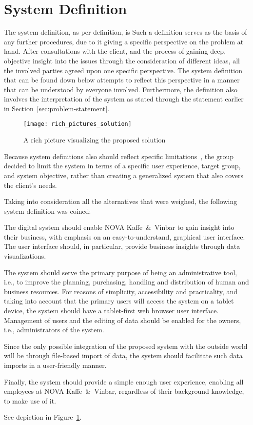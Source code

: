 \section{System Definition}\label{sec:system-definition}

The system definition, as per definition, is
Such a definition serves as the basis of any further procedures, due to it giving a specific perspective on the problem
at hand.
After consultations with the client, and the process of gaining deep, objective insight into the issues through the
consideration of different ideas, all the involved parties agreed upon one specific perspective.
The system definition that can be found down below attempts to reflect this perspective in a manner that can be
understood by everyone involved.
Furthermore, the definition also involves the interpretation of the system as stated through the statement earlier in
Section~\ref{sec:problem-statement}.

\begin{figure}[H]
    \centering
    \texttt{[image: rich\_pictures\_solution]}
    \caption{A rich picture visualizing the proposed solution}\label{fig:pda-solution}
\end{figure}

Because system definitions also should reflect specific limitations~\cite[38]{mathiassen2018}, the group decided to
limit the system in terms of a specific user experience, target group, and system objective, rather than creating a
generalized system that also covers the client's needs.

Taking into consideration all the alternatives that were weighed, the following system definition was coined:
\begin{tcolorbox}[title=System definition]
    The digital system should enable NOVA Kaffe~\&~Vinbar to gain insight into their business, with emphasis on an
    easy-to-understand, graphical user interface.
    The user interface should, in particular, provide business insights through data visualizations.

    The system should serve the primary purpose of being an administrative tool, i.e., to improve the planning,
    purchasing, handling and distribution of human and business resources.
    For reasons of simplicity, accessibility and practicality, and taking into account that the primary users will
    access the system on a tablet device, the system should have a tablet-first web browser user interface.
    Management of users and the editing of data should be enabled for the owners, i.e., administrators of the system.

    Since the only possible integration of the proposed system with the outside world will be through file-based import
    of data, the system should facilitate such data imports in a user-friendly manner.

    Finally, the system should provide a simple enough user experience, enabling all employees at NOVA Kaffe~\&~Vinbar,
    regardless of their background knowledge, to make use of it.
\end{tcolorbox}

See depiction in Figure~\ref{fig:pda-solution}.
